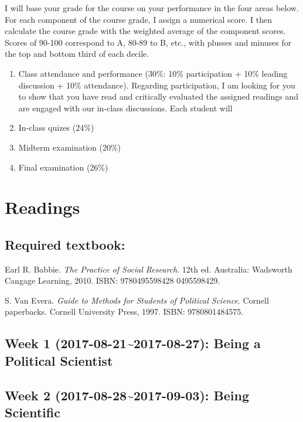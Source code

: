 \documentclass[11pt,]{article}
\begin{document}
I will base your grade for the course on your performance in the four
areas below. For each component of the course grade, I assign a
numerical score. I then calculate the course grade with the weighted
average of the component scores. Scores of 90-100 correspond to A, 80-89
to B, etc., with plusses and minuses for the top and bottom third of
each decile.

\begin{enumerate}
\def\labelenumi{\arabic{enumi}.}
\item
  Class attendance and performance (30\%: 10\% participation + 10\%
  leading discussion + 10\% attendance). Regarding participation, I am
  looking for you to show that you have read and critically evaluated
  the assigned readings and are engaged with our in-class discussions.
  Each student will
\item
  In-class quizes (24\%)
\item
  Midterm examination (20\%)
\item
  Final examination (26\%)
\end{enumerate}

\section{Readings}\label{readings}

\subsection{Required textbook:}\label{required-textbook}

Earl R. Babbie. \emph{The Practice of Social Research}. 12th ed.
Australia: Wadsworth Cangage Learning, 2010. ISBN: 9780495598428
0495598429.

S. Van Evera. \emph{Guide to Methods for Students of Political Science}.
Cornell paperbacks. Cornell University Press, 1997. ISBN: 9780801484575.

\subsection{Week 1 (2017-08-21\textasciitilde{}2017-08-27): Being a
Political
Scientist}\label{week-1-2017-08-212017-08-27-being-a-political-scientist}

\subsection{Week 2 (2017-08-28\textasciitilde{}2017-09-03): Being
Scientific}\label{week-2-2017-08-282017-09-03-being-scientific}
\end{document}
